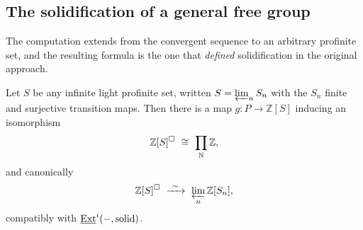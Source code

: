 \subsection{The solidification of a general free group}

The computation extends from the convergent sequence to an arbitrary profinite
set, and the resulting formula is the one that \emph{defined} solidification in
the original approach.

\begin{proposition}
\label{prop:5:general-S}
Let $S$ be any infinite light profinite set, written $S=\varprojlim_{n}S_{n}$
with the $S_{n}$ finite and surjective transition maps. Then there is a map
$g\colon P\to\mathbb{Z}[S]$ inducing an isomorphism
\begin{equation*}
\mathbb{Z}[S]^{\solid}\ \cong\ \prod_{\mathbb{N}}\mathbb{Z},
\end{equation*}
and canonically
\begin{equation}
\label{eq:5:ZS-limit}
\mathbb{Z}[S]^{\solid}\ \xrightarrow{\ \sim\ }\ \varprojlim_{n}\mathbb{Z}[S_{n}],
\end{equation}
compatibly with $\underline{\operatorname{Ext}}^{i}(-,\text{solid})$.
\end{proposition}

